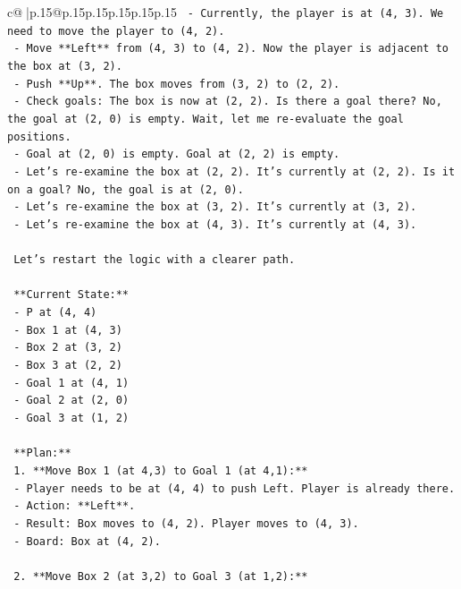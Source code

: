 \documentclass{article}
\begin{document}
{\begin{supertabular}{c@{$\;$}|p{.15\linewidth}@{}p{.15\linewidth}p{.15\linewidth}p{.15\linewidth}p{.15\linewidth}p{.15\linewidth}}
{{{\texttt{    {-} Currently, the player is at (4, 3). We need to move the player to (4, 2).} \\
\texttt{    {-} Move **Left** from (4, 3) to (4, 2). Now the player is adjacent to the box at (3, 2).} \\
\texttt{    {-} Push **Up**. The box moves from (3, 2) to (2, 2).} \\
\texttt{    {-} Check goals: The box is now at (2, 2). Is there a goal there? No, the goal at (2, 0) is empty. Wait, let me re{-}evaluate the goal positions.} \\
\texttt{    {-} Goal at (2, 0) is empty. Goal at (2, 2) is empty.} \\
\texttt{    {-} Let's re{-}examine the box at (2, 2). It's currently at (2, 2). Is it on a goal? No, the goal is at (2, 0).} \\
\texttt{    {-} Let's re{-}examine the box at (3, 2). It's currently at (3, 2).} \\
\texttt{    {-} Let's re{-}examine the box at (4, 3). It's currently at (4, 3).} \\
\\ 
\texttt{    Let's restart the logic with a clearer path.} \\
\\ 
\texttt{    **Current State:**} \\
\texttt{    {-} P at (4, 4)} \\
\texttt{    {-} Box 1 at (4, 3)} \\
\texttt{    {-} Box 2 at (3, 2)} \\
\texttt{    {-} Box 3 at (2, 2)} \\
\texttt{    {-} Goal 1 at (4, 1)} \\
\texttt{    {-} Goal 2 at (2, 0)} \\
\texttt{    {-} Goal 3 at (1, 2)} \\
\\ 
\texttt{    **Plan:**} \\
\texttt{    1.  **Move Box 1 (at 4,3) to Goal 1 (at 4,1):**} \\
\texttt{        {-} Player needs to be at (4, 4) to push Left. Player is already there.} \\
\texttt{        {-} Action: **Left**.} \\
\texttt{        {-} Result: Box moves to (4, 2). Player moves to (4, 3).} \\
\texttt{        {-} Board: Box at (4, 2).} \\
\\ 
\texttt{    2.  **Move Box 2 (at 3,2) to Goal 3 (at 1,2):**} \\
}}}
\end{supertabular}}
\end{document}
